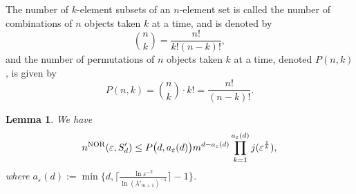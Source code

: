 \documentclass{amsart}
\newtheorem{lem}[thm]{Lemma}
\numberwithin{equation}{section}
\def\vz{\varepsilon}
\begin{document}
The number of $k$-element subsets of an $n$-element set is called the number of combinations of $n$ objects taken
$k$ at a time, and is denoted by
$$\binom{n}{k}=\frac{n!}{k!(n-k)!},$$
and the number of permutations of $n$ objects taken $k$ at a time, denoted $P(n,k)$, is given by
 $$P(n,k)=\binom{n}{k}\cdot k!=\frac{n!}{(n-k)!}.$$



\begin{lem}\label{lem2}
We have
\begin{equation}\label{2.3}
n^{\rm NOR}(\vz,S_d')\le
P\big(d,{a_{\vz}(d)}\big)m^{d-a_{\vz}(d)}\prod_{k=1}^{a_{\vz}(d)}j(\vz^{\frac{1}{k}}),
\end{equation}
where  $a_{\vz}(d):=\min\big\{d,
\big\lceil\frac{\ln\vz^{-2}}{\ln(\lambda'_{m+1})^{-1}}\big\rceil-1\big\}$.
\end{lem}
\end{document}

